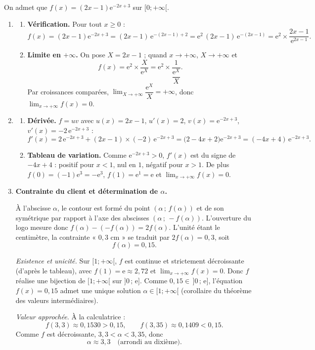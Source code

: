 \documentclass[11pt,a4paper]{article}
\newcommand{\e}{\mathrm{e}}
\begin{document}
On admet que $f(x)=(2x-1)\e^{-2x+3}$ sur $[0;+\infty[$.

\begin{enumerate}

\item \begin{enumerate}
\item \textbf{Vérification.} Pour tout $x\geqslant0$ :
\[
f(x)=(2x-1)\e^{-2x+3}=(2x-1)\,\e^{-(2x-1)+2}=\e^{2}\,(2x-1)\,\e^{-(2x-1)}=\e^2\times\dfrac{2x-1}{\e^{2x-1}}.
\]

\item \textbf{Limite en $+\infty$.} On pose $X=2x-1$ ; quand $x\to+\infty$, $X\to+\infty$ et
\[
f(x)=\e^2\times\dfrac{X}{\e^{X}}=\e^2\times\dfrac{1}{\dfrac{\e^X}{X}}.
\]
Par croissances comparées, $\lim_{X\to+\infty}\dfrac{\e^X}{X}=+\infty$, donc
$\lim_{x\to+\infty}f(x)=0$.
\end{enumerate}

\item \begin{enumerate}
\item \textbf{Dérivée.} $f=uv$ avec $u(x)=2x-1$, $u'(x)=2$, $v(x)=\e^{-2x+3}$, $v'(x)=-2\,\e^{-2x+3}$ :
\[
f'(x)=2\,\e^{-2x+3}+(2x-1)\times(-2)\,\e^{-2x+3}
=\bigl(2-4x+2\bigr)\e^{-2x+3}=(-4x+4)\,\e^{-2x+3}.
\]

\item \textbf{Tableau de variation.} Comme $\e^{-2x+3}>0$, $f'(x)$ est du signe de $-4x+4$ :
positif pour $x<1$, nul en $1$, négatif pour $x>1$. De plus
$f(0)=(-1)\e^{3}=-\e^3$, $f(1)=\e^{1}=\e$ et $\lim_{x\to+\infty}f(x)=0$.

\begin{center}
\end{center}
\end{enumerate}

\item \textbf{Contrainte du client et détermination de $\alpha$.}

À l'abscisse $\alpha$, le contour est formé du point $(\alpha\,;\,f(\alpha))$ et de son symétrique par
rapport à l'axe des abscisses $(\alpha\,;\,-f(\alpha))$. L'ouverture du logo mesure donc
$f(\alpha)-(-f(\alpha))=2f(\alpha)$. L'unité étant le centimètre, la contrainte « $0{,}3$ cm »
se traduit par $2f(\alpha)=0{,}3$, soit
\[
f(\alpha)=0{,}15.
\]

\emph{Existence et unicité.} Sur $[1;+\infty[$, $f$ est continue et strictement décroissante
(d'après le tableau), avec $f(1)=\e\approx2{,}72$ et $\lim_{x\to+\infty}f(x)=0$.
Donc $f$ réalise une bijection de $[1;+\infty[$ sur $]0\,;\,\e]$. Comme $0{,}15\in\,]0\,;\,\e]$,
l'équation $f(x)=0{,}15$ admet une unique solution $\alpha\in[1;+\infty[$ (corollaire du théorème des
valeurs intermédiaires).

\emph{Valeur approchée.} À la calculatrice :
\[
f(3{,}3)\approx0{,}1530>0{,}15,\qquad f(3{,}35)\approx0{,}1409<0{,}15.
\]
Comme $f$ est décroissante, $3{,}3<\alpha<3{,}35$, donc
\[
\alpha\approx3{,}3\quad\text{(arrondi au dixième).}
\]
\end{enumerate}
\end{document}
